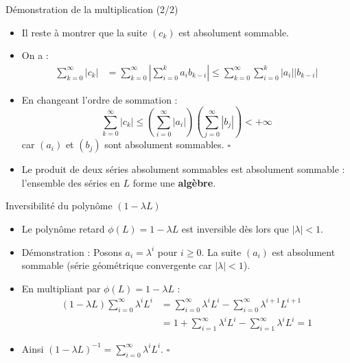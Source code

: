 \documentclass[11pt,aspectratio=169]{beamer}
\begin{document}
\begin{frame}{Démonstration de la multiplication (2/2)}

\begin{itemize}

\item Il reste à montrer que la suite $(c_k)$ est absolument sommable.\newline

\item On a :
  \begin{align*}
  \sum_{k=0}^{\infty} |c_k| &= \sum_{k=0}^{\infty} \left| \sum_{i=0}^{k} a_i b_{k-i} \right| \leq \sum_{k=0}^{\infty} \sum_{i=0}^{k} |a_i| |b_{k-i}|
  \end{align*}\newline

\item En changeant l'ordre de sommation :
  \[
  \sum_{k=0}^{\infty} |c_k| \leq \left( \sum_{i=0}^{\infty} |a_i| \right) \left( \sum_{j=0}^{\infty} |b_j| \right) < +\infty
  \]
  car $(a_i)$ et $(b_j)$ sont absolument sommables. \hfill $\square$\newline

\item Le produit de deux séries absolument sommables est absolument sommable : l'ensemble des séries en $L$ forme une \textbf{algèbre}.

\end{itemize}

\end{frame}

\begin{frame}{Inversibilité du polynôme $(1 - \lambda L)$}

\begin{itemize}

\item Le polynôme retard $\phi(L) = 1 - \lambda L$ est inversible dès lors que $|\lambda| < 1$.\newline

\item Démonstration : Posons $a_i = \lambda^i$ pour $i \geq 0$. La suite $(a_i)$ est absolument sommable (série géométrique convergente car $|\lambda| < 1$).\newline

\item En multipliant par $\phi(L) = 1 - \lambda L$ :
  \begin{align*}
  (1 - \lambda L) \sum_{i=0}^{\infty} \lambda^i L^i &= \sum_{i=0}^{\infty} \lambda^i L^i - \sum_{i=0}^{\infty} \lambda^{i+1} L^{i+1} \\
  &= 1 + \sum_{i=1}^{\infty} \lambda^i L^i - \sum_{i=1}^{\infty} \lambda^i L^i = 1
  \end{align*}\newline

\item Ainsi $(1 - \lambda L)^{-1} = \sum_{i=0}^{\infty} \lambda^i L^i$. \hfill $\square$

\end{itemize}

\end{frame}
\end{document}
